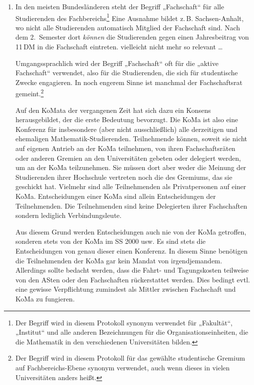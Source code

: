 \begin{enumerate}
\renewcommand\labelenumi{zu \theenumi:}
\item In den meisten Bundesländeren steht der Begriff „Fachschaft“ für alle
	Studierenden des Fachbereichs\footnote{Der Begriff wird in diesem
	Protokoll synonym verwendet für „Fakultät“, „Institut“ und alle anderen
	Bezeichnungen für die Organisationseinheiten, die die Mathematik in den
	verschiedenen Universitäten bilden.} Eine Ausnahme bildet z.\,B.
	Sachsen-Anhalt, wo nicht alle Studierenden automatisch Mitglied der
	Fachschaft sind. Nach dem 2.~Semester dort \emph{können} die
	Studierenden gegen einen Jahresbeitrag von 11\,DM in die Fachschaft
	eintreten. %
	vielleicht nicht mehr so relevant …

	Umgangssprachlich wird der Begriff „Fachschaft“ oft für die „aktive
	Fachschaft“ verwendet, also für die Studierenden, die sich für
	studentische Zwecke engagieren. In noch engerem Sinne ist manchmal der
	Fachschaftsrat gemeint.\footnote{Der Begriff wird in diesem Protokoll
	für das gewählte studentische Gremium auf Fachbereichs-Ebene synonym
	verwendet, auch wenn dieses in vielen Universitäten anders heißt.}

	Auf den KoMata der vergangenen Zeit hat sich dazu ein Konsens
	herausgebildet, der die erste Bedeutung bevorzugt. Die KoMa ist also
	eine Konferenz für insbesondere (aber nicht ausschließlich) alle
	derzeitigen und ehemaligen Mathematik-Studierenden. Teilnehmende
	können, soweit sie nicht auf eigenen Antrieb an der KoMa teilnehmen,
	von ihren Fachschaftsräten oder anderen Gremien an den Universitäten
	gebeten oder delegiert werden, um an der KoMa teilzunehmen. Sie müssen
	dort aber weder die Meinung der Studierenden ihrer Hochschule vertreten
	noch die des Gremiums, das sie geschickt hat. Vielmehr sind alle
	Teilnehmenden als Privatpersonen auf einer KoMa. Entscheidungen einer
	KoMa sind allein Entscheidungen der Teilnehmenden. Die Teilnehmenden
	sind keine Delegierten ihrer Fachschaften sondern lediglich
	Verbindungsleute.

	Aus diesem Grund werden Entscheidungen auch nie von der KoMa getroffen,
	sonderen stets von der KoMa im SS 2000 usw. Es sind stets die
	Entscheidungen von genau dieser einen Konferenz. In diesem Sinne
	benötigen die Teilnehmenden der KoMa gar kein Mandat von
	irgendjemandem. Allerdings sollte bedacht werden, dass die Fahrt- und
	Tagungskosten teilweise von den ASten oder den Fachschaften
	rückerstattet werden. Dies bedingt evtl.  eine gewisse Verpflichtung
	zumindest als Mittler zwischen Fachschaft und KoMa zu fungieren.


\end{enumerate}
